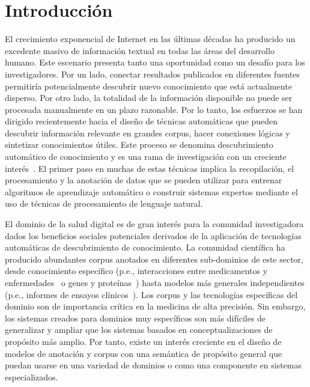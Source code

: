 \chapter{Introducción}\label{Chapter1:Introduction}

El crecimiento exponencial de Internet en las últimas décadas ha producido un excedente masivo de información textual en todas las áreas del desarrollo humano. Este escenario presenta tanto una oportunidad como un desafío para los investigadores. Por un lado, conectar resultados publicados en diferentes fuentes permitiría potencialmente descubrir nuevo conocimiento que está actualmente disperso. Por otro lado, la totalidad de la información disponible no puede ser procesada manualmente en un plazo razonable. Por lo tanto, los esfuerzos se han dirigido recientemente hacia el diseño de técnicas automáticas que pueden descubrir información relevante en grandes corpus, hacer conexiones lógicas y sintetizar conocimientos útiles.
Este proceso se denomina descubrimiento automático de conocimiento y es una rama de investigación con un creciente interés~\cite{maimon2005data}.
El primer paso en muchas de estas técnicas implica la recopilación, el procesamiento y la anotación de datos que se pueden utilizar para entrenar algoritmos de aprendizaje automático o construir sistemas expertos mediante el uso de técnicas de procesamiento de lenguaje natural.

El dominio de la salud digital es de gran interés para la comunidad investigadora dados los beneficios sociales potenciales derivados de la aplicación de tecnologías automáticas de descubrimiento de conocimiento. La comunidad científica ha producido abundantes corpus anotados en diferentes sub-dominios de este sector, desde conocimiento específico (p.e., interacciones entre medicamentos y enfermedades~\cite{goldberg1996drug} o genes y proteínas~\cite{tanabe2005genetag}) hasta modelos más generales independientes (p.e., informes de ensayos clínicos~\cite{nye2018corpus}).
Los corpus y las tecnologías específicas del dominio son de importancia crítica en la medicina de alta precisión.
Sin embargo, los sistemas creados para dominios muy específicos son más difíciles de generalizar y ampliar que los sistemas basados en conceptualizaciones de propósito más amplio.
Por tanto, existe un interés creciente en el diseño de modelos de anotación y corpus con una semántica de propósito general que puedan usarse en una variedad de dominios o como una componente en sistemas especializados.

